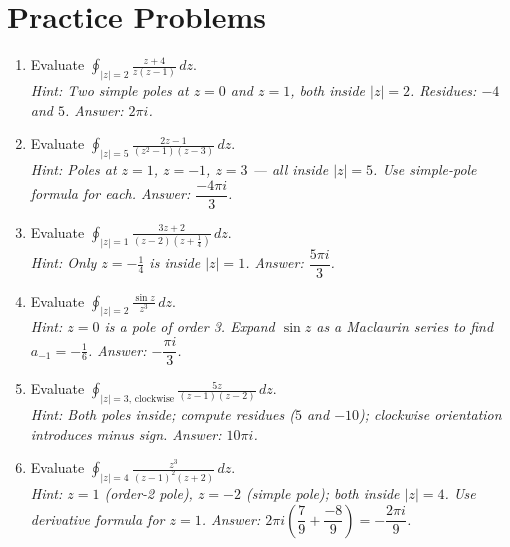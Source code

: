 \documentclass[12pt,a4paper]{article}
\begin{document}
\section{Practice Problems}

\begin{enumerate}[label=\textbf{P\arabic*.}, leftmargin=*]

\item Evaluate $\displaystyle\oint_{|z|=2}\frac{z+4}{z(z-1)}\,dz$.\\
  \textit{Hint: Two simple poles at $z=0$ and $z=1$, both inside $|z|=2$.
  Residues: $-4$ and $5$. Answer: $2\pi i$.}

\item Evaluate $\displaystyle\oint_{|z|=5}\frac{2z-1}{(z^2-1)(z-3)}\,dz$.\\
  \textit{Hint: Poles at $z=1$, $z=-1$, $z=3$ --- all inside $|z|=5$.
  Use simple-pole formula for each.
  Answer: $\dfrac{-4\pi i}{3}$.}

\item Evaluate $\displaystyle\oint_{|z|=1}\frac{3z+2}{(z-2)(z+\frac{1}{4})}\,dz$.\\
  \textit{Hint: Only $z=-\tfrac{1}{4}$ is inside $|z|=1$. Answer: $\dfrac{5\pi i}{3}$.}

\item Evaluate $\displaystyle\oint_{|z|=2}\frac{\sin z}{z^3}\,dz$.\\
  \textit{Hint: $z=0$ is a pole of order 3. Expand $\sin z$ as a Maclaurin
  series to find $a_{-1} = -\tfrac{1}{6}$.
  Answer: $-\dfrac{\pi i}{3}$.}

\item Evaluate $\displaystyle\oint_{|z|=3,\,\text{clockwise}}
  \frac{5z}{(z-1)(z-2)}\,dz$.\\
  \textit{Hint: Both poles inside; compute residues ($5$ and $-10$);
  clockwise orientation introduces minus sign.
  Answer: $10\pi i$.}

\item Evaluate $\displaystyle\oint_{|z|=4}
  \frac{z^3}{(z-1)^2(z+2)}\,dz$.\\
  \textit{Hint: $z=1$ (order-2 pole), $z=-2$ (simple pole); both inside $|z|=4$.
  Use derivative formula for $z=1$.
  Answer: $2\pi i\!\left(\dfrac{7}{9}+\dfrac{-8}{9}\right) = -\dfrac{2\pi i}{9}$.}

\end{enumerate}
\end{document}
